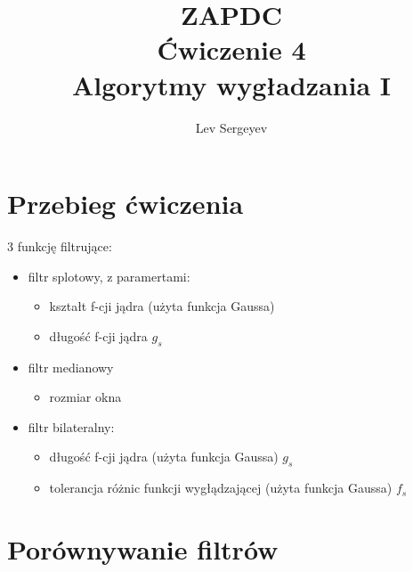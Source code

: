 \documentclass{article}
\author{Lev Sergeyev}
\title{ZAPDC \\ Ćwiczenie 4 \\ Algorytmy wygładzania I}
\date{ }
\begin{document}
\maketitle


\section{Przebieg ćwiczenia}
3 funkcję filtrujące:
\begin{itemize} 
	\item filtr splotowy, z paramertami:
	\begin{itemize} 
		\item kształt f-cji jądra (użyta funkcja Gaussa)
		\item długość f-cji jądra \(g_s \)
	\end{itemize}
	\item filtr medianowy
	\begin{itemize} 
		\item rozmiar okna
	\end{itemize}
	\item filtr bilateralny:
	\begin{itemize} 
		\item długość f-cji jądra (użyta funkcja Gaussa) \(g_s \)
		\item tolerancja różnic funkcji wygłądzającej (użyta funkcja Gaussa) \(f_s \)
	\end{itemize}
\end{itemize}

\section{Porównywanie filtrów}
\end{document}
